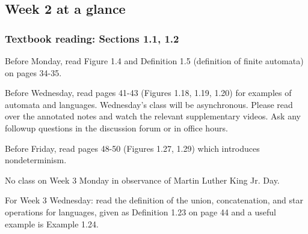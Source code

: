 \documentclass[12pt, oneside]{article}
\begin{document}
\begin{flushright}
\end{flushright} 
\subsection*{Week 2 at a glance}

\vspace{-15pt}

\subsubsection*{Textbook reading: Sections 1.1, 1.2}

\vspace{-15pt}

Before Monday, read Figure 1.4 and Definition 1.5 (definition of finite automata) on pages 34-35.

Before Wednesday, read pages 41-43 (Figures 1.18, 1.19, 1.20) for examples of automata and languages. Wednesday's class will be asynchronous. Please read over the annotated notes and watch the relevant supplementary videos. Ask any followup questions in the discussion forum or in office hours.

Before Friday, read pages 48-50 (Figures 1.27, 1.29) which introduces nondeterminism.

No class on Week 3 Monday in observance of Martin Luther King Jr. Day.

For Week 3 Wednesday: read the definition of the union, concatenation, and star operations for languages,  given 
as Definition 1.23 on page 44 and a useful example is Example 1.24.

\vspace{-20pt}
\end{document}
